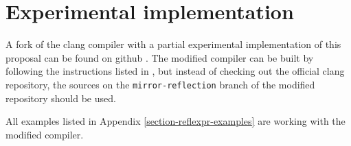 \section{Experimental implementation}

A fork of the clang compiler with a partial experimental implementation
of this proposal can be found on github \cite{clang-reflexpr-impl}.
The modified compiler can be built by following the instructions listed
in \cite{clang-getting-started}, but instead of checking out the official clang
repository, the sources on the \texttt{mirror-reflection} branch of the modified
repository should be used.

All examples listed in Appendix \ref{section-reflexpr-examples} are working with
the modified compiler.
